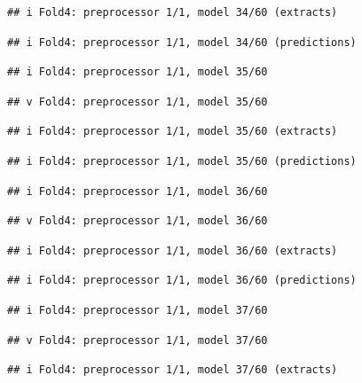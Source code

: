 \documentclass[
]{article}
\begin{document}
\begin{verbatim}
## i Fold4: preprocessor 1/1, model 34/60 (extracts)
\end{verbatim}

\begin{verbatim}
## i Fold4: preprocessor 1/1, model 34/60 (predictions)
\end{verbatim}

\begin{verbatim}
## i Fold4: preprocessor 1/1, model 35/60
\end{verbatim}

\begin{verbatim}
## v Fold4: preprocessor 1/1, model 35/60
\end{verbatim}

\begin{verbatim}
## i Fold4: preprocessor 1/1, model 35/60 (extracts)
\end{verbatim}

\begin{verbatim}
## i Fold4: preprocessor 1/1, model 35/60 (predictions)
\end{verbatim}

\begin{verbatim}
## i Fold4: preprocessor 1/1, model 36/60
\end{verbatim}

\begin{verbatim}
## v Fold4: preprocessor 1/1, model 36/60
\end{verbatim}

\begin{verbatim}
## i Fold4: preprocessor 1/1, model 36/60 (extracts)
\end{verbatim}

\begin{verbatim}
## i Fold4: preprocessor 1/1, model 36/60 (predictions)
\end{verbatim}

\begin{verbatim}
## i Fold4: preprocessor 1/1, model 37/60
\end{verbatim}

\begin{verbatim}
## v Fold4: preprocessor 1/1, model 37/60
\end{verbatim}

\begin{verbatim}
## i Fold4: preprocessor 1/1, model 37/60 (extracts)
\end{verbatim}
\end{document}
